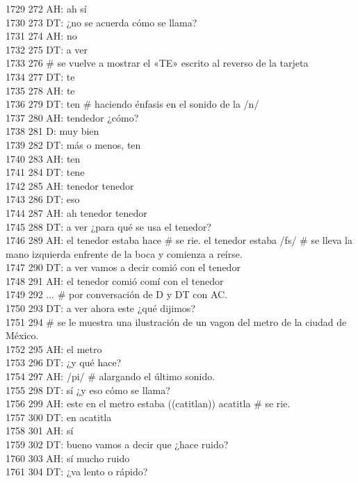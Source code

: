 1729 272 AH: ah sí\\
1730 273 DT: ¿no se acuerda cómo se llama?\\
1731 274 AH: no\\
1732 275 DT: a ver\\
1733 276 # se vuelve a mostrar el «TE» escrito al reverso de la tarjeta\\
1734 277 DT: te\\
1735 278 AH: te\\
1736 279 DT: ten # haciendo énfasis en el sonido de la /n/\\
1737 280 AH: tendedor ¿cómo?\\
1738 281 D: muy bien\\
1739 282 DT: más o menos, ten\\
1740 283 AH: ten\\
1741 284 DT: tene\\
1742 285 AH: tenedor tenedor\\
1743 286 DT: eso\\
1744 287 AH: ah tenedor tenedor \\
1745 288 DT: a ver ¿para qué se usa el tenedor?\\
1746 289 AH: el tenedor estaba hace # se rie. el tenedor estaba /fs/ # se lleva la mano izquierda enfrente de la boca y comienza a reírse.\\
1747 290 DT: a ver vamos a decir comió con el tenedor\\
1748 291 AH: el tenedor comió comí con el tenedor\\
1749 292 ... # por conversación de D y DT con AC.\\
1750 293 DT: a ver ahora este ¿qué dijimos?\\
1751 294 # se le muestra una ilustración de un vagon del metro de la ciudad de México.\\
1752 295 AH: el metro\\
1753 296 DT: ¿y qué hace?\\
1754 297 AH: /pi/ # alargando el último sonido.\\
1755 298 DT: sí ¿y eso cómo se llama?\\
1756 299 AH: este en el metro estaba ((catitlan)) acatitla # se rie.\\
1757 300 DT: en acatitla\\
1758 301 AH: sí\\
1759 302 DT: bueno vamos a decir que ¿hace ruido?\\
1760 303 AH: sí mucho ruido\\
1761 304 DT: ¿va lento o rápido?\\
